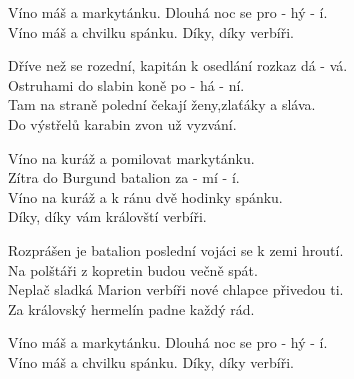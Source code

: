 
\re{}
Víno máš a markytánku. Dlouhá noc se pro - hý - í.\\
Víno máš a chvilku spánku. Díky, díky verbíři.
 
\ve{}
Dříve než se rozední, kapitán k osedlání rozkaz dá - vá.\\
Ostruhami do slabin koně po - há - ní.\\
Tam na straně polední čekají ženy,zlaťáky a sláva.\\
Do výstřelů karabin zvon už vyzvání.

\cho{}
Víno na kuráž a pomilovat markytánku.\\
Zítra do Burgund batalion za - mí - í.\\
Víno na kuráž a k ránu dvě hodinky spánku.\\
Díky, díky vám královští verbíři.

\ve{}
Rozprášen je batalion poslední vojáci se k zemi hroutí.\\
Na polštáři z kopretin  budou večně spát.\\
Neplač sladká Marion verbíři nové chlapce přivedou ti.\\
Za královský hermelín padne každý rád.

\cho{}

\re{}
Víno máš a markytánku. Dlouhá noc se pro - hý - í.\\
Víno máš a chvilku spánku. Díky, díky verbíři.
      
      

\esong